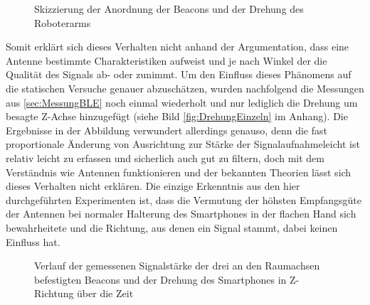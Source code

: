 \begin{figure}
\caption{Skizzierung der Anordnung der Beacons und der Drehung des Roboterarms}
\label{fig:DrehungSkizze}
\end{figure}
Somit erklärt sich dieses Verhalten nicht anhand der Argumentation, dass eine Antenne bestimmte Charakteristiken aufweist und je nach Winkel der die Qualität des Signals ab- oder zunimmt. Um den Einfluss dieses Phänomens auf die statischen Versuche genauer abzuschätzen, wurden nachfolgend die Messungen aus \ref{sec:MessungBLE} noch einmal wiederholt und nur lediglich die Drehung um besagte Z-Achse hinzugefügt (siehe Bild \ref{fig:DrehungEinzeln} im Anhang). Die Ergebnisse in der Abbildung verwundert allerdings genauso, denn die fast proportionale Änderung von Ausrichtung zur Stärke der Signalaufnahmeleicht ist relativ leicht zu erfassen und sicherlich auch gut zu filtern, doch mit dem Verständnis wie Antennen funktionieren und der bekannten Theorien lässt sich dieses Verhalten nicht erklären. Die einzige Erkenntnis aus den hier durchgeführten Experimenten ist, dass die Vermutung  der höhsten Empfangsgüte der Antennen bei normaler Halterung des Smartphones in der flachen Hand sich bewahrheitete und die Richtung, aus denen ein Signal stammt, dabei keinen Einfluss hat.
\begin{figure}[H] 
\centering
{}
\caption{Verlauf der gemessenen Signalstärke der drei an den Raumachsen befestigten Beacons und der Drehung des Smartphones in Z-Richtung über die Zeit}
\label{fig:DrehungAlle}
\end{figure}

